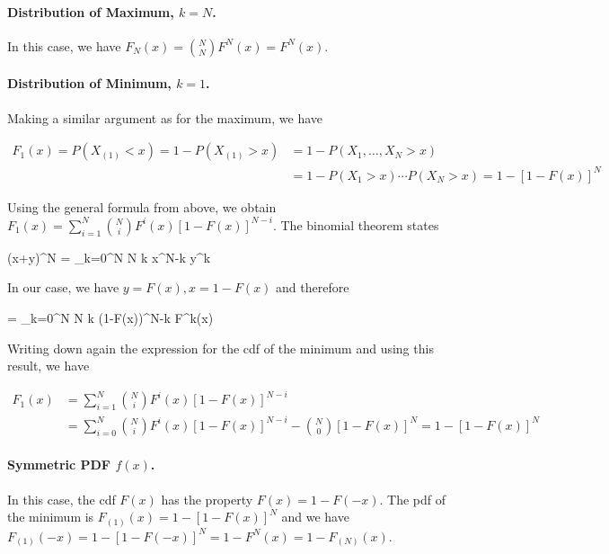 \paragraph{Distribution of Maximum, $k=N$.} In this case, we have $F_N(x) = {N \choose N} F^N(x) = F^N(x)$.

\paragraph{Distribution of Minimum, $k=1$.} Making a similar argument as for the maximum, we have 

\begin{align*}
F_1(x) = P(X_{(1)} < x) = 1 - P(X_{(1)} > x) & = 1 - P(X_1, \ldots, X_N > x) \\ & = 1 - P(X_1 > x) \cdots P(X_N > x) = 1 - \left[1- F(x)\right]^N
\end{align*}

Using the general formula from above, we obtain $F_1(x) = \sum_{i=1}^N {N \choose i} F^i(x) \left[ 1 - F(x) \right]^{N-i}$. The binomial theorem states

\bee
(x+y)^N = \sum_{k=0}^N {N \choose k} x^{N-k} y^k
\eee

In our case, we have $y = F(x), x = 1 - F(x)$ and therefore

 = \sum_{k=0}^N {N \choose k} (1-F(x))^{N-k} F^k(x)
\eee

Writing down again the expression for the cdf of the minimum and using this result, we have

\begin{align*}
F_1(x) & = \sum_{i=1}^N {N \choose i} F^i(x) \left[ 1 - F(x) \right]^{N-i} \\ & = \sum_{i=0}^N {N \choose i} F^i(x) \left[ 1 - F(x) \right]^{N-i} - {N \choose 0} \left[ 1 - F(x) \right]^{N} = 1 - \left[ 1 - F(x) \right]^{N}
\end{align*}

\paragraph{Symmetric PDF $f(x)$.} In this case, the cdf $F(x)$ has the property $F(x) = 1 - F(-x)$. The pdf of the minimum is $F_{(1)}(x) = 1 - \left[ 1 - F(x) \right]^{N}$ and we have $F_{(1)}(-x) = 1 - \left[ 1 - F(-x) \right]^{N} = 1-F^N(x) = 1 - F_{(N)}(x)$.







